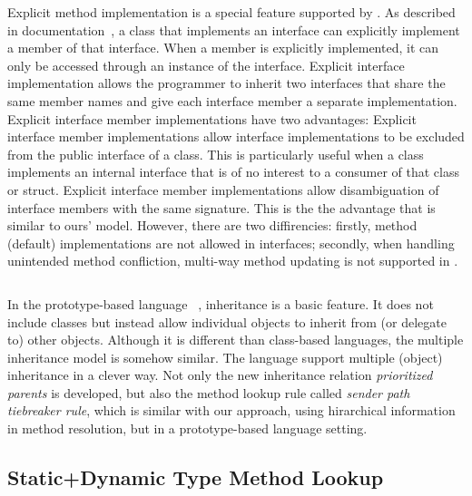 \begin{lstlisting}
\end{lstlisting}

Explicit method implementation is a special feature supported by \csharp. As described in \csharp
documentation~\cite{csharpdoc}, a class that implements an interface can explicitly implement a member of that
interface. When a member is explicitly implemented, it can only be accessed through an instance
of the interface. Explicit interface implementation allows the programmer to inherit two interfaces 
that share the same member names and give each interface member a separate implementation. 
Explicit interface member implementations have two advantages:
Explicit interface member implementations allow interface implementations to be excluded 
from the public interface of a class. This is particularly useful when a class implements an internal 
interface that is of no interest to a consumer of that class or struct.
Explicit interface member implementations allow disambiguation of interface members with the 
same signature. This is the the advantage that is similar to ours' model. However, there are two 
diffirencies: firstly, method (default) implementations are not allowed in \csharp interfaces; 
secondly, when handling unintended method confliction, multi-way method updating is not supported 
in \csharp.

\begin{lstlisting}
\end{lstlisting}

 In the prototype-based language \self~\cite{Chambers1991}, inheritance is a basic feature.
It does not include classes but instead allow individual objects to inherit from (or delegate to) other objects. 
Although it is different than class-based languages, the multiple inheritance model is somehow similar. The \self 
language support multiple (object) inheritance in a clever way. Not only the new inheritance
relation \emph{prioritized parents} is developed, but also the method lookup rule called 
\emph{sender path tiebreaker rule}, which is similar with our approach, using hirarchical 
information in method resolution, but in a prototype-based language setting.

\subsection{Static+Dynamic Type Method Lookup}

